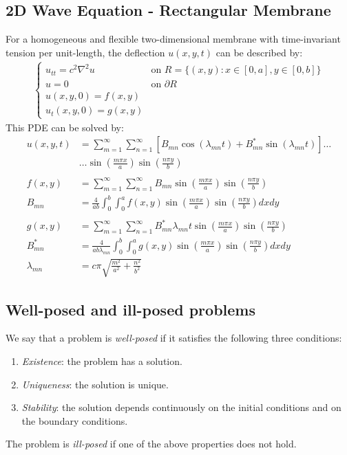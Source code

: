 \subsection{2D Wave Equation - Rectangular Membrane}\label{ssec:2d_wave_rect}
For a homogeneous and flexible two-dimensional membrane with time-invariant tension per unit-length,
the deflection $u(x,y,t)$ can be described by:
\begin{align*}
    \begin{cases}
        u_{tt}=c^2\nabla^2u & \text{on }R=\{(x,y):x\in[0,a],y\in[0,b]\} \\
        u=0                 & \text{on }\partial R                      \\
        u(x,y,0)=f(x,y)                                                 \\
        u_t(x,y,0)=g(x,y)
    \end{cases}
\end{align*}
This PDE can be solved by:
\begin{align*}
    u(x,y,t)     & =\sum_{m=1}^{\infty}\sum_{n=1}^{\infty}\left[B_{mn}\cos(\lambda_{mn}t)+B_{mn}^{*}\sin(\lambda_{mn}t)\right]\dots
    \\&\dots \sin\left(\frac{m\pi x}{a}\right)\sin\left(\frac{n\pi y}{b}\right)\\\\
    f(x,y)       & =\sum_{m=1}^{\infty}\sum_{n=1}^{\infty}B_{mn}\sin\left(\frac{m\pi x}a\right)\sin\left(\frac{n\pi y}b\right)              \\
    B_{mn}       & = \frac4{ab}\int_0^b\int_0^{a}f(x,y)\sin\left(\frac{m\pi x}a\right)\sin\left(\frac{n\pi y}b\right)dx dy                  \\\\
    g(x,y)       & =\sum_{m=1}^\infty\sum_{n=1}^\infty B_{mn}^*\lambda_{mn}t\sin\left(\frac{m\pi x}a\right)\sin\left(\frac{n\pi y}b\right)  \\
    B_{mn}^{*}   & =\frac4{ab\lambda_{mn}}\int_{0}^{b}\int_{0}^{a}g(x,y)\sin\left(\frac{m\pi x}a\right)\sin\left(\frac{n\pi y}b\right)dx dy \\
    \lambda_{mn} & = c\pi\sqrt{\frac{m^2}{a^2}+\frac{n^2}{b^2}}
\end{align*}

\subsection{Well-posed and ill-posed problems}
We say that a problem is \textit{well-posed} if it satisfies the following three conditions:
\begin{enumerate}
    \item \textit{Existence}: the problem has a solution.
    \item \textit{Uniqueness}: the solution is unique.
    \item \textit{Stability}: the solution depends continuously on the initial conditions and on the boundary conditions.
\end{enumerate}
The problem is \textit{ill-posed} if one of the above properties does not hold.

